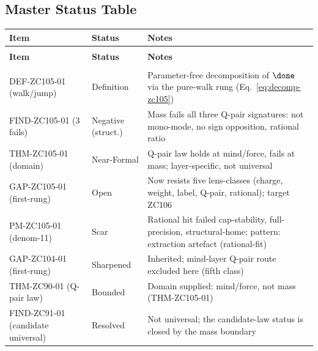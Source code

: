 \documentclass[12pt, a4paper]{article}
\begin{document}
\subsection{Master Status Table}
\label{sec:status-zc105}

{\small
\setlength{\LTpre}{4pt}\setlength{\LTpost}{4pt}
\renewcommand{\arraystretch}{1.30}
\begin{longtable}{>{\raggedright\arraybackslash}p{4.2cm}
                  >{\centering\arraybackslash}p{2.4cm}
                  >{\raggedright\arraybackslash}p{6.0cm}}
\toprule
\textbf{Item} & \textbf{Status} & \textbf{Notes} \\
\midrule
\endfirsthead
\multicolumn{3}{l}{\small\textit{(continued)}}\\[4pt]
\toprule\textbf{Item} & \textbf{Status} & \textbf{Notes}\\\midrule
\endhead
\midrule\multicolumn{3}{r}{\small\textit{(continues)}}\\
\endfoot
\bottomrule
\endlastfoot
DEF-ZC105-01 (walk/jump) & Definition
  & Parameter-free decomposition of $\done$ via the pure-walk rung
    (Eq.~\ref{eq:decomp-zc105}) \\[4pt]
FIND-ZC105-01 (3 fails) & Negative (struct.)
  & Mass fails all three Q-pair signatures: not mono-mode, no sign opposition,
    rational ratio \\[4pt]
THM-ZC105-01 (domain) & Near-Formal
  & Q-pair law holds at mind/force, fails at mass; layer-specific, not
    universal \\[4pt]
GAP-ZC105-01 (first-rung) & Open
  & Now resists five lens-classes (charge, weight, label, Q-pair, rational);
    target ZC106 \\[4pt]
PM-ZC105-01 (denom-11) & Scar
  & Rational hit failed cap-stability, full-precision, structural-home;
    pattern: extraction artefact (rational-fit) \\[4pt]
\midrule
GAP-ZC104-01 (first-rung) & Sharpened
  & Inherited; mind-layer Q-pair route excluded here (fifth class) \\[4pt]
THM-ZC90-01 (Q-pair law) & Bounded
  & Domain supplied: mind/force, not mass (THM-ZC105-01) \\[4pt]
FIND-ZC91-01 (candidate universal) & Resolved
  & Not universal; the candidate-law status is closed by the mass boundary \\
\end{longtable}
}
\end{document}

